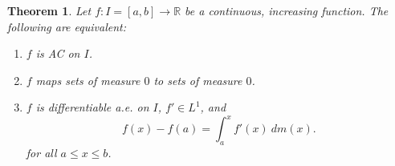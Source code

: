 \documentclass[12pt]{article}
\theoremstyle{thmstyle}
\newtheorem{theorem}{Theorem}[section]
\theoremstyle{defstyle}
\newcommand{\R}{\mathbb{R}}
\renewcommand{\le}{\leqslant}
\begin{document}
\begin{theorem}
    Let $f: I = [a,b]\to\R$ be a continuous, increasing function. The following are equivalent: 
    \begin{enumerate}[label=(\alph*)]
        \item $f$ is AC on $I$.
        \item $f$ maps sets of measure $0$ to sets of measure $0$. 
        \item $f$ is differentiable a.e. on $I$, $f'\in L^1$, and 
        \begin{equation*}
            f(x) - f(a) = \int_a^x f'(x)~dm(x).
        \end{equation*}
        for all $a\le x\le b$.
    \end{enumerate}
\end{theorem}
\end{document}
